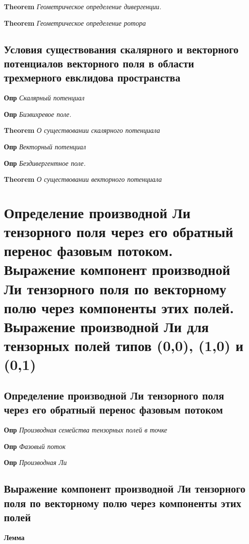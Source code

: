 \documentclass[a4paper, 14pt]{article}
\begin{document}
    \textbf{Theorem} \textit{Геометрическое определение дивергенции.}
    
    \textbf{Theorem} \textit{Геометрическое определение ротора}
    
    \subsection{Условия существования скалярного и векторного потенциалов векторного поля в области трехмерного
    евклидова пространства}
    
    \textbf{Опр} \textit{Скалярный потенциал}
    
    \textbf{Опр} \textit{Бизвихревое поле.}
    
    \textbf{Theorem} \textit{О существовании скалярного потенциала}
    
    \textbf{Опр} \textit{Векторный потенциал}
    
    \textbf{Опр} \textit{Бездивергентное поле.}
    
    \textbf{Theorem} \textit{О существовании векторного потенциала}
    
    \section{Определение производной Ли тензорного поля через его обратный перенос фазовым потоком.
    Выражение компонент производной Ли тензорного поля по векторному полю через компоненты этих полей.
    Выражение производной Ли для тензорных полей типов (0,0), (1,0) и (0,1)}
    
    \subsection{Определение производной Ли тензорного поля через его обратный перенос фазовым потоком}
    
    \textbf{Опр} \textit{Производная семейства тензорных полей в точке}
    
    \textbf{Опр} \textit{Фазовый поток}
    
    \textbf{Опр} \textit{Производная Ли}
    
    \subsection{Выражение компонент производной Ли тензорного поля по векторному полю через компоненты этих полей}
    
    \textbf{Лемма}
    
\end{document}
